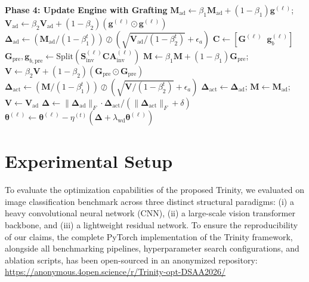 \documentclass[conference]{IEEEtran}
\begin{document}
\begin{algorithm*}[!t]
\begin{algorithmic}[1]
    \Statex \textbf{Phase 4: Update Engine with Grafting}
        \State $\mathbf{M}_{\mathrm{ad}} \leftarrow \beta_1 \mathbf{M}_{\mathrm{ad}} + (1-\beta_1)\mathbf{g}^{(\ell)}$; $\mathbf{V}_{\mathrm{ad}} \leftarrow \beta_2 \mathbf{V}_{\mathrm{ad}} + (1-\beta_2)(\mathbf{g}^{(\ell)} \odot \mathbf{g}^{(\ell)})$
        \State $\boldsymbol{\Delta}_{\mathrm{ad}} \leftarrow (\mathbf{M}_{\mathrm{ad}} / (1-\beta_1^t)) \oslash (\sqrt{\mathbf{V}_{\mathrm{ad}} / (1-\beta_2^t)} + \epsilon_a)$ 
            \State $\mathbf{C} \leftarrow [\mathbf{G}^{(\ell)} \;\; \mathbf{g}_b^{(\ell)}]$
            \State $\mathbf{G}_{\mathrm{pre}}, \mathbf{g}_{b,\mathrm{pre}} \leftarrow \mathrm{Split}(\mathbf{S}_{\mathrm{inv}}^{(\ell)} \mathbf{C} \mathbf{A}_{\mathrm{inv}}^{(\ell)})$
            \State $\mathbf{M} \leftarrow \beta_1 \mathbf{M} + (1-\beta_1)\mathbf{G}_{\mathrm{pre}}$; $\mathbf{V} \leftarrow \beta_2 \mathbf{V} + (1-\beta_2)(\mathbf{G}_{\mathrm{pre}} \odot \mathbf{G}_{\mathrm{pre}})$
            \State $\boldsymbol{\Delta}_{\mathrm{act}} \leftarrow (\mathbf{M} / (1-\beta_1^t)) \oslash (\sqrt{\mathbf{V} / (1-\beta_2^t)} + \epsilon_a)$
        \Else
            \State $\boldsymbol{\Delta}_{\mathrm{act}} \leftarrow \boldsymbol{\Delta}_{\mathrm{ad}}$; $\mathbf{M} \leftarrow \mathbf{M}_{\mathrm{ad}}$; $\mathbf{V} \leftarrow \mathbf{V}_{\mathrm{ad}}$ 
        \EndIf
        \State $\boldsymbol{\Delta} \leftarrow \|\boldsymbol{\Delta}_{\mathrm{ad}}\|_F \cdot \boldsymbol{\Delta}_{\mathrm{act}} / (\|\boldsymbol{\Delta}_{\mathrm{act}}\|_F + \delta)$ 
        \State $\boldsymbol{\theta}^{(\ell)} \leftarrow \boldsymbol{\theta}^{(\ell)} - \eta^{(t)}(\boldsymbol{\Delta} + \lambda_{\mathrm{wd}}\boldsymbol{\theta}^{(\ell)})$
    \EndFor
\EndWhile
\end{algorithmic}
\end{algorithm*}

\section{Experimental Setup}
\label{sec:experimental_setup}

To evaluate the optimization capabilities of the proposed Trinity, we evaluated on image classification benchmark across three distinct structural paradigms: (i) a heavy
convolutional neural network (CNN), (ii) a large-scale vision transformer backbone, and (iii) a lightweight residual network.
To ensure the reproducibility of our claims, the complete PyTorch implementation of the Trinity framework, alongside all benchmarking pipelines, hyperparameter search configurations, and ablation scripts, has been open-sourced in an anonymized repository: \url{https://anonymous.4open.science/r/Trinity-opt-DSAA2026/}
\end{document}

